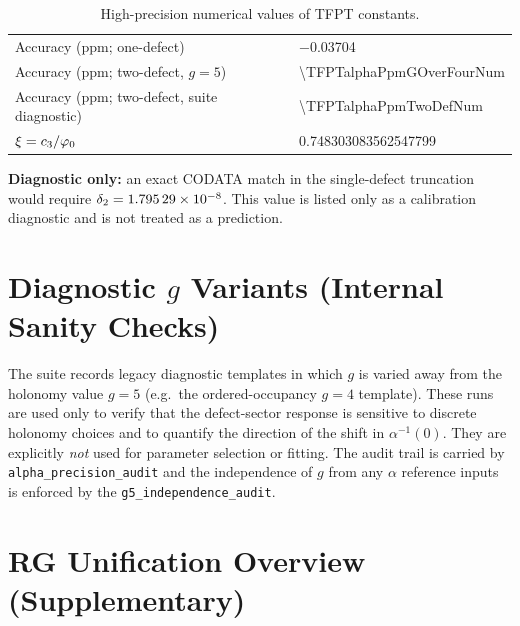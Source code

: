 \begin{table}[H]
\begin{tabular}{@{}ll@{}}
Accuracy (ppm; one-defect) & \num[round-mode=places,round-precision=6]{-0.03704}\\
Accuracy (ppm; two-defect, $g=5$) & \num[round-mode=places,round-precision=6]{\TFPTalphaPpmGOverFourNum}\\
Accuracy (ppm; two-defect, suite diagnostic) & \num[round-mode=places,round-precision=6]{\TFPTalphaPpmTwoDefNum}\\
$\xi = c_3/\varphi_0$ & \num[round-mode=places,round-precision=9]{0.748303083562547799}\\
\bottomrule
\end{tabular}
\caption{High-precision numerical values of TFPT constants.}
\label{tab:constants}
\end{table}

\begin{remark}
\textbf{Diagnostic only:} an exact CODATA match in the single-defect truncation would require
$\delta_2=\num[round-mode=figures,round-precision=6]{\TFPTdeltaTwoOptimalNum}$.
This value is listed only as a calibration diagnostic and is not treated as a prediction.
\end{remark}

\section{Diagnostic \texorpdfstring{$g$}{g} Variants (Internal Sanity Checks)}
\label{app:gdiagnostic}

The suite records legacy diagnostic templates in which $g$ is varied away from the holonomy
value $g=5$ (e.g.\ the ordered-occupancy $g=4$ template). These runs are used only to verify
that the defect-sector response is sensitive to discrete holonomy choices and to quantify the
direction of the shift in $\alpha^{-1}(0)$. They are explicitly \emph{not} used for parameter
selection or fitting. The audit trail is carried by \texttt{alpha\_precision\_audit} and the
independence of $g$ from any $\alpha$ reference inputs is enforced by the
\texttt{g5\_independence\_audit}.

\section{RG Unification Overview (Supplementary)}


